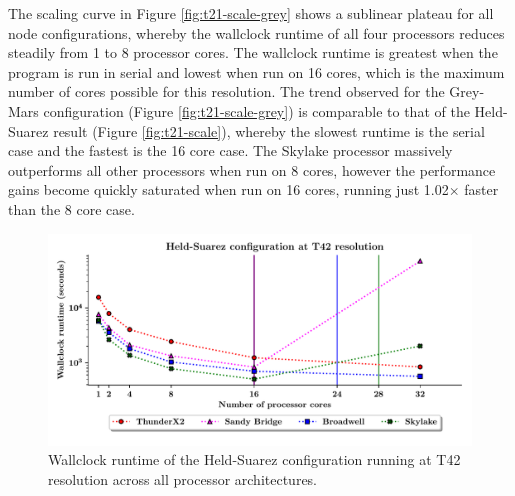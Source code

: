 \documentclass[a4paper,11pt]{report}
\begin{document}
The scaling curve in Figure \ref{fig:t21-scale-grey} shows a sublinear plateau for all node configurations, whereby the wallclock runtime of all four processors reduces steadily from 1 to 8 processor cores. The wallclock runtime is greatest when the program is run in serial and lowest when run on 16 cores, which is the maximum number of cores possible for this resolution. The trend observed for the Grey-Mars configuration (Figure \ref{fig:t21-scale-grey}) is comparable to that of the Held-Suarez result (Figure \ref{fig:t21-scale}), whereby the slowest runtime is the serial case and the fastest is the 16 core case. The Skylake processor massively outperforms all other processors when run on 8 cores, however the performance gains become quickly saturated when run on 16 cores, running just 1.02$\times$ faster than the 8 core case.
\par
\begin{figure}[htbp]
\begin{center}
\includegraphics[width=1\textwidth]{img/scaling_graph_T42_Held_suarez.pdf}
\caption[Wallclock runtime of the Held-Suarez configuration running at T42 resolution]{Wallclock runtime of the Held-Suarez configuration running at T42 resolution across all processor architectures.}
\label{fig:t42-scale}
\end{center}
\end{figure}
\end{document}
